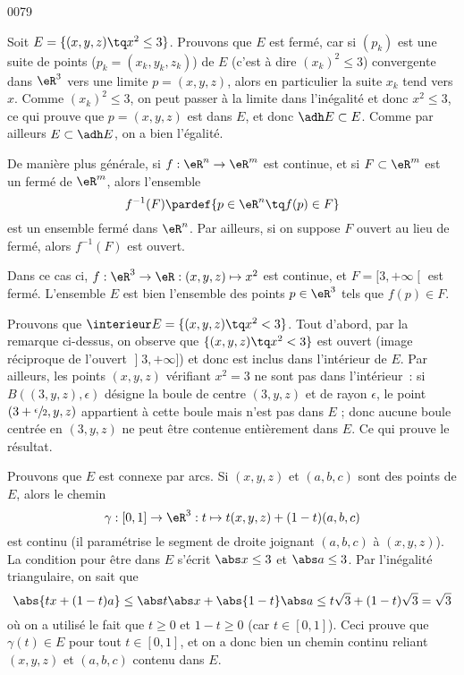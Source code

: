 
\begin{corrige}{0079}


Soit $E = \{ (x,y,z) \tq x^2 \leq 3\}$. Prouvons que $E$ est
fermé, car si $(p_k)$ est une suite de points ($p_k = (x_k,y_k,z_k)$)
de $E$ (c'est à dire $(x_k)^2 \leq 3$) convergente dans $\eR^3$ vers une limite
$p = (x,y,z)$, alors en particulier la suite $x_k$ tend vers
$x$. Comme $(x_k)^2 \leq 3$, on peut passer à la limite dans
l'inégalité et donc $x^2 \leq 3$, ce qui prouve que $p = (x,y,z)$ est
dans $E$, et donc $\adh E \subset E$. Comme par ailleurs $E \subset
\adh E$, on a bien l'égalité.

\begin{remark}
  De manière plus générale, si $f : \eR^n \to \eR^m$ est continue,
  et si $F \subset \eR^m$ est un fermé de $\eR^m$, alors l'ensemble
  \begin{equation*}
    f^{-1}(F) \pardef \{ p \in\eR^n \tq f(p) \in F \}
  \end{equation*}
  est un ensemble fermé dans $\eR^n$. Par ailleurs, si on suppose $F$
  ouvert au lieu de fermé, alors $f^{-1}(F)$ est ouvert.

  Dans ce cas ci, $f : \eR^3 \to \eR : (x,y,z) \mapsto x^2$ est
  continue, et $F = \mathopen[3,+\infty\mathclose[$ est
  fermé. L'ensemble $E$ est bien l'ensemble des points $p \in \eR^3$
  tels que $f(p) \in F$.
\end{remark}

Prouvons que $\interieur E = \{ (x,y,z) \tq x^2 < 3\}$. Tout
d'abord, par la remarque ci-dessus, on observe que $\{ (x,y,z) \tq
x^2 < 3\}$ est ouvert (image réciproque de l'ouvert
$\mathopen]3,+\infty\mathclose]$) et donc est inclus dans l'intérieur
de $E$. Par ailleurs, les points $(x,y,z)$ vérifiant $x^2 = 3$ ne sont
pas dans l'intérieur~: si $B((3,y,z),\epsilon)$ désigne la boule de
centre $(3,y,z)$ et de rayon $\epsilon$, le point
$(3+\sfrac\epsilon2,y,z)$ appartient à cette boule mais n'est pas dans
$E$ ; donc aucune boule centrée en $(3,y,z)$ ne peut être contenue
entièrement dans $E$. Ce qui prouve le résultat.

Prouvons que $E$ est connexe par arcs. Si $(x,y,z)$ et $(a,b,c)$ sont
des points de $E$, alors le chemin
\begin{equation*}
  \gamma : [0,1] \to \eR^3 : t \mapsto t (x,y,z) + (1-t) (a,b,c)
\end{equation*}
est continu (il paramétrise le segment de droite joignant $(a,b,c)$ à
$(x,y,z)$). La condition pour être dans $E$ s'écrit $\abs x \leq 3$ et
$\abs a \leq 3$. Par l'inégalité triangulaire, on sait que
\begin{equation*}
  \abs{tx+(1-t)a} \leq \abs t \abs x + \abs{1-t} \abs a \leq t \sqrt3
  + (1-t) \sqrt 3 = \sqrt 3
\end{equation*}
où on a utilisé le fait que $t \geq 0$ et $1-t \geq 0$ (car $t \in
[0,1]$). Ceci prouve que $\gamma(t) \in E$ pour tout $t \in [0,1]$, et
on a donc bien un chemin continu reliant $(x,y,z)$ et $(a,b,c)$
contenu dans $E$.

\end{corrige}
